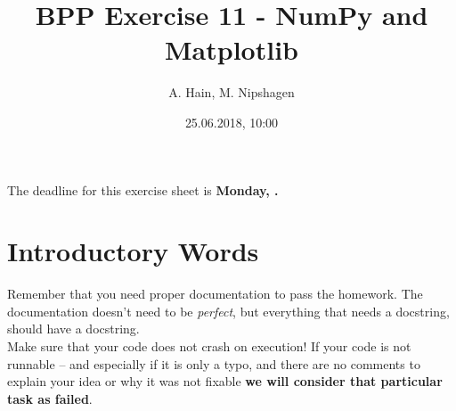
\usepackage{setspace}

\title{BPP Exercise 11 - NumPy and Matplotlib}
\author{A. Hain, M. Nipshagen}
\date{25.06.2018, 10:00}


\makeatletter
\let\thetitle\@title
\let\theauthor\@author
\let\thedate\@date
\makeatother


\newcommand\itemsub[1]{
	\begin{itemize}
		\item #1
	\end{itemize}
}

\renewcommand\sol[1]{}




The deadline for this exercise sheet is \textbf{Monday, \thedate.}

\section*{Introductory Words}
Remember that you need proper documentation to pass
the homework. The documentation doesn't need to be \textit{perfect}, but
everything that needs a docstring, should have a docstring.\\
Make sure that your code does not crash on execution! If your code is not
runnable -- and especially if it is only a typo, and there are no comments
to explain your idea or why it was not fixable \textbf{we will consider that
particular task as failed}.



